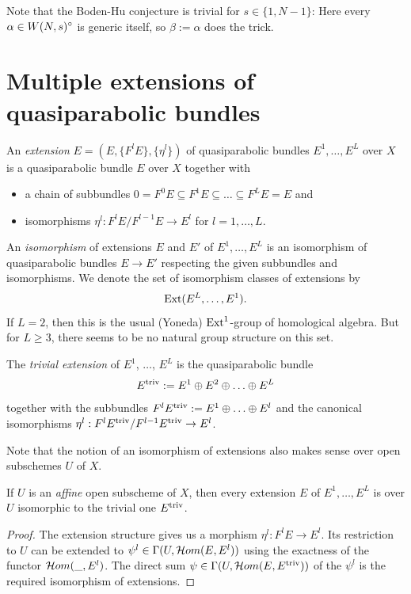 \documentclass{article}
\begin{document}
Note that the Boden-Hu conjecture is trivial for $s \in \{1, N-1\}$: Here every $\alpha \in W(N, s)^{\circ}$ is generic itself, so $\beta := \alpha$ does the
trick.


\section{Multiple extensions of quasiparabolic bundles} \label{extensions}

\begin{defn}
  An \emph{extension} $E = (E, \{F^l E\}, \{\eta^l\})$ of quasiparabolic bundles $E^1, \ldots, E^L$ over $X$ is a quasiparabolic bundle $E$ over $X$
  together with
  \begin{itemize}
   \item a chain of subbundles $0 = F^0 E \subseteq F^1 E \subseteq \ldots \subseteq F^L E = E$ and
   \item isomorphisms $\eta^l: F^l E/F^{l-1} E \to E^l$ for $l = 1, \ldots, L$.
  \end{itemize}
\end{defn}

An \emph{isomorphism} of extensions $E$ and $E'$ of $E^1, \ldots, E^L$ is an isomorphism of quasiparabolic bundles $E \to E'$ respecting the given
subbundles and isomorphisms. We denote the set of isomorphism classes of extensions by
\begin{displaymath}
  \mathrm{Ext}(E^L, \ldots, E^1).
\end{displaymath}
If $L=2$, then this is the usual (Yoneda) $\mathrm{Ext}^1$-group of homological algebra. But for $L \geq 3$, there seems to be no natural group structure on
this set.

\begin{example}
  The \emph{trivial extension} of $E^1$, $\ldots$, $E^L$ is the quasiparabolic bundle
  \begin{displaymath}
    E^{\mathrm{triv}} := E^1 \oplus E^2 \oplus \ldots \oplus E^L
  \end{displaymath}
  together with the subbundles $F^l E^{\mathrm{triv}} := E^1 \oplus \ldots \oplus E^l$ and the canonical isomorphisms $\eta^l: F^l E^{\mathrm{triv}} / F^{l-1} E^{\mathrm{triv}}
  \to E^l$.
\end{example}

Note that the notion of an isomorphism of extensions also makes sense over open subschemes $U$ of $X$.
\begin{lemma} \label{affine_trivial}
  If $U$ is an \emph{affine} open subscheme of $X$, then every extension $E$ of $E^1, \ldots, E^L$ is over $U$ isomorphic to the trivial one $E^{\mathrm{triv}}$.
\end{lemma}
\begin{proof}
  The extension structure gives us a morphism $\eta^l: F^l E \to E^l$. Its restriction to $U$ can be extended to $\psi^l \in \Gamma( U, \mathcal{H}om( E,
  E^l))$ using the exactness of the functor $\mathcal{H}om( \_, E^l)$. The direct sum $\psi \in \Gamma( U, \mathcal{H}om( E, E^{\mathrm{triv}}))$ of the $\psi^l$ is
  the required isomorphism of extensions.
\end{proof}
\end{document}
